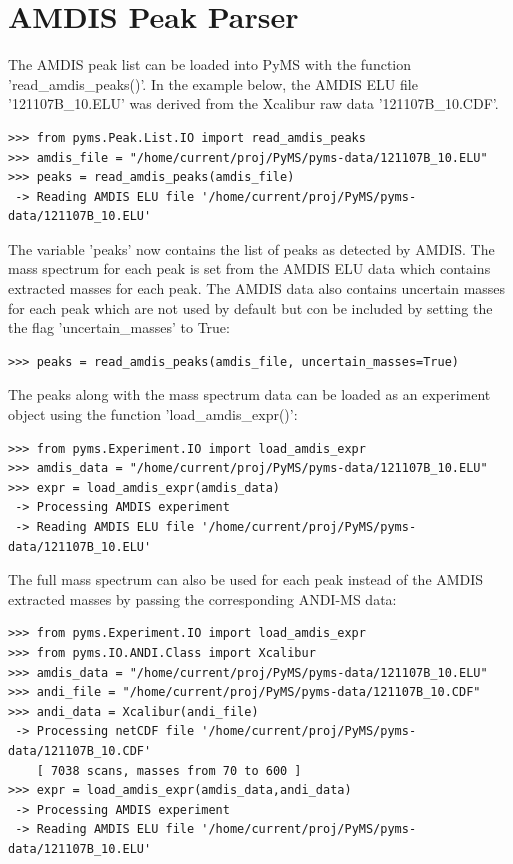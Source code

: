 \section{AMDIS Peak Parser}


The AMDIS peak list can be loaded into PyMS with the function 'read\_amdis\_peaks()'.
In the example below, the AMDIS ELU file '121107B\_10.ELU' was derived from the
Xcalibur raw data '121107B\_10.CDF'. 

\begin{verbatim}
>>> from pyms.Peak.List.IO import read_amdis_peaks
>>> amdis_file = "/home/current/proj/PyMS/pyms-data/121107B_10.ELU"
>>> peaks = read_amdis_peaks(amdis_file)
 -> Reading AMDIS ELU file '/home/current/proj/PyMS/pyms-data/121107B_10.ELU'
\end{verbatim}

\noindent
The variable 'peaks' now contains the list of peaks as detected by AMDIS.  The mass
spectrum for each peak is set from the AMDIS ELU data which contains extracted masses
for each peak. The AMDIS data also contains uncertain masses for each peak which are
not used by default but con be included by setting the the flag 'uncertain\_masses'
to True:

\begin{verbatim}
>>> peaks = read_amdis_peaks(amdis_file, uncertain_masses=True)
\end{verbatim}

The peaks along with the mass spectrum data can be loaded as an experiment 
object using the function 'load\_amdis\_expr()':

\begin{verbatim}
>>> from pyms.Experiment.IO import load_amdis_expr
>>> amdis_data = "/home/current/proj/PyMS/pyms-data/121107B_10.ELU"
>>> expr = load_amdis_expr(amdis_data)
 -> Processing AMDIS experiment
 -> Reading AMDIS ELU file '/home/current/proj/PyMS/pyms-data/121107B_10.ELU'
\end{verbatim}

The full mass spectrum can also be used for each peak instead of the AMDIS extracted masses
by passing the corresponding ANDI-MS data:

\begin{verbatim}
>>> from pyms.Experiment.IO import load_amdis_expr
>>> from pyms.IO.ANDI.Class import Xcalibur
>>> amdis_data = "/home/current/proj/PyMS/pyms-data/121107B_10.ELU"
>>> andi_file = "/home/current/proj/PyMS/pyms-data/121107B_10.CDF"
>>> andi_data = Xcalibur(andi_file)
 -> Processing netCDF file '/home/current/proj/PyMS/pyms-data/121107B_10.CDF'
    [ 7038 scans, masses from 70 to 600 ]
>>> expr = load_amdis_expr(amdis_data,andi_data)
 -> Processing AMDIS experiment
 -> Reading AMDIS ELU file '/home/current/proj/PyMS/pyms-data/121107B_10.ELU'
\end{verbatim}

